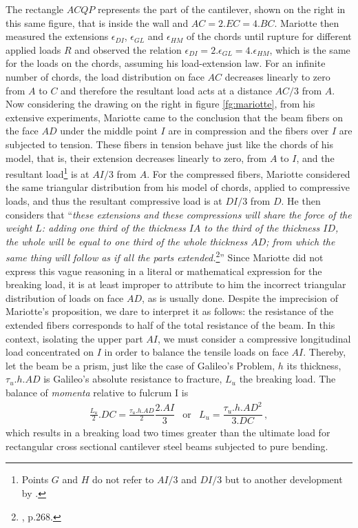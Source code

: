 The rectangle $ACQP$ represents the part of the cantilever, shown on the right in this same figure, that is inside the wall and $AC=2.EC=4.BC$. Mariotte then measured the extensions $\epsilon_{DI}$, $\epsilon_{GL}$ and $\epsilon_{HM}$  of the chords until rupture for different applied loads $R$ and observed the relation $\epsilon_{DI}=2.\epsilon_{GL}=4.\epsilon_{HM}$, which is the same for the loads on the chords, assuming his load-extension law. For an infinite number of chords, the load distribution on face $AC$ decreases linearly to zero from $A$ to $C$ and therefore the resultant load acts at a distance $AC/3$ from $A$. Now considering the drawing on the right in figure \ref{fg:mariotte}, from his extensive experiments, Mariotte came to the conclusion that the beam fibers on the face $AD$ under the middle point $I$ are in compression and the fibers over $I$ are subjected to tension. These fibers in tension behave just like the chords of his model, that is, their extension decreases linearly to zero, from $A$ to $I$, and the resultant load\footnote{Points $G$ and $H$  do not refer to $AI/3$ and $DI/3$ but to another development by \cite{mariotte_1740_1}.} is at $AI/3$ from $A$. For the compressed fibers, Mariotte considered the same triangular distribution from his model of chords, applied to compressive loads, and thus the resultant compressive load is at $DI/3$ from $D$. He then considers that ``\emph{these extensions and these compressions will share the force of the weight $L$: adding one third of the thickness $IA$ to the third of the thickness $ID$, the whole will be equal to one third of the whole thickness $AD$; from which the same thing will follow as if all the parts extended.}\footnote{\cite{benvenuto_1991}, p.268.}'' Since Mariotte did not express this vague reasoning in a literal or mathematical expression for the breaking load, it is at least improper to attribute to him the incorrect triangular distribution of loads on face $AD$, as is usually done. Despite the imprecision of Mariotte's proposition, we dare to interpret it as follows: the resistance of the extended fibers corresponds to half of the total resistance of the beam. In this context, isolating the upper part $AI$, we must consider a compressive longitudinal load concentrated on $I$ in order to balance the tensile loads on face $AI$. Thereby, let the beam be a prism, just like the case of Galileo's Problem, $h$ its thickness, $\tau_u.h.AD$ is Galileo's absolute resistance to fracture, $L_u$ the breaking load. The balance of \emph{momenta} relative to fulcrum I is  
\begin{eqnarray*}
\frac{L_u}{2}.DC = \frac{\tau_u.h.AD}{2} \dfrac{2.AI}{3}&\text{or}&L_u=\dfrac{\tau_u.h.AD^2}{3.DC}\,,
\end{eqnarray*}
which results in a breaking load two times greater than the ultimate load for rectangular cross sectional cantilever steel beams subjected to pure bending. 

